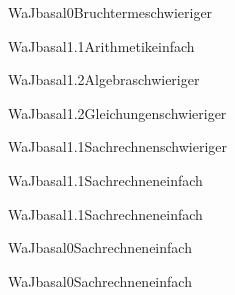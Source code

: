 \documentclass[12pt]{article}
\begin{document}
\begin{Add}{WaJ}{basal0}{Bruchterme}{schwieriger}
\end{Add}

\begin{Add}{WaJ}{basal1.1}{Arithmetik}{einfach}
\end{Add}

\begin{Add}{WaJ}{basal1.2}{Algebra}{schwieriger}
\end{Add}

\begin{Add}{WaJ}{basal1.2}{Gleichungen}{schwieriger}
\end{Add}

\begin{Add}{WaJ}{basal1.1}{Sachrechnen}{schwieriger}
\end{Add}

\begin{Add}{WaJ}{basal1.1}{Sachrechnen}{einfach}
\end{Add}

\begin{Add}{WaJ}{basal1.1}{Sachrechnen}{einfach}
\end{Add}

\begin{Add}{WaJ}{basal0}{Sachrechnen}{einfach}
\end{Add}

\begin{Add}{WaJ}{basal0}{Sachrechnen}{einfach}
\end{Add}
\end{document}
